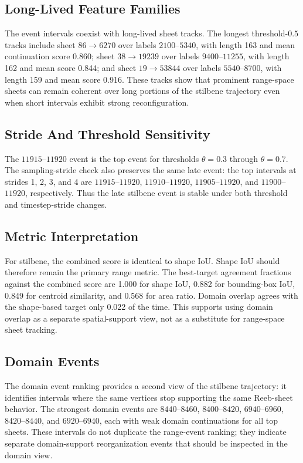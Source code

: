 \subsection{Long-Lived Feature Families}

The event intervals coexist with long-lived sheet tracks. The longest
threshold-\(0.5\) tracks include sheet \(86\rightarrow6270\) over labels
\(2100\)--\(5340\), with length 163 and mean continuation score 0.860; sheet
\(38\rightarrow19239\) over labels \(9400\)--\(11255\), with length 162 and mean
score 0.844; and sheet \(19\rightarrow53844\) over labels \(5540\)--\(8700\),
with length 159 and mean score 0.916. These tracks show that prominent
range-space sheets can remain coherent over long portions of the stilbene
trajectory even when short intervals exhibit strong reconfiguration.

\subsection{Stride And Threshold Sensitivity}

The \(11915\)--\(11920\) event is the top event for thresholds
\(\theta=0.3\) through \(\theta=0.7\). The sampling-stride check also preserves
the same late event: the top intervals at strides 1, 2, 3, and 4 are
\(11915\)--\(11920\), \(11910\)--\(11920\), \(11905\)--\(11920\), and
\(11900\)--\(11920\), respectively. Thus the late stilbene event is stable
under both threshold and timestep-stride changes.

\subsection{Metric Interpretation}

For stilbene, the combined score is identical to shape IoU. Shape IoU should
therefore remain the primary range metric. The best-target agreement fractions
against the combined score are 1.000 for shape IoU, 0.882 for bounding-box IoU,
0.849 for centroid similarity, and 0.568 for area ratio. Domain overlap agrees
with the shape-based target only 0.022 of the time. This supports using domain
overlap as a separate spatial-support view, not as a substitute for
range-space sheet tracking.

\subsection{Domain Events}

The domain event ranking provides a second view of the stilbene trajectory: it
identifies intervals where the same vertices stop supporting the same
Reeb-sheet behavior. The strongest domain events are \(8440\)--\(8460\),
\(8400\)--\(8420\), \(6940\)--\(6960\), \(8420\)--\(8440\), and
\(6920\)--\(6940\), each with weak domain continuations for all top sheets.
These intervals do not duplicate the range-event ranking; they indicate
separate domain-support reorganization events that should be inspected in the
domain view.

